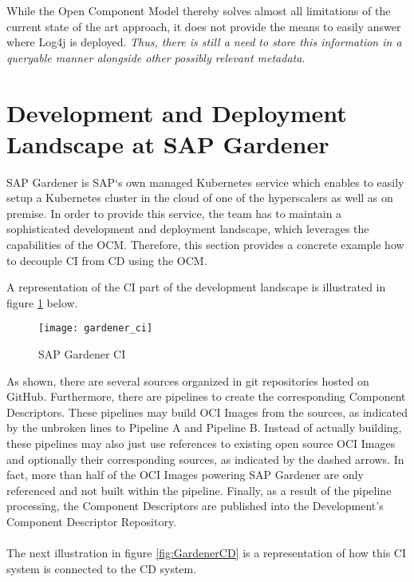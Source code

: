 While the Open Component Model thereby solves almost all limitations of the current state of the art approach, it does not provide the means to easily answer where Log4j %
is deployed. \emph{Thus, there is still a need to store this information in a queryable manner alongside other possibly relevant metadata.} %

\section{Development and Deployment Landscape at SAP Gardener} \label{sec:Development and Deployment Landscape at SAP Gardener}
SAP Gardener is SAP`s own managed Kubernetes service which enables to easily setup a Kubernetes cluster in the cloud of one of the hyperscalers as well as on premise. In order to provide this service, the team has to maintain a sophisticated development and deployment landscape, which leverages the capabilities of the OCM. Therefore, this section provides a concrete example how to decouple CI from CD using the OCM.\par
A representation of the CI part of the development landscape is illustrated in figure \ref{fig:GardenerCI} below.

\begin{figure}[H]
	\centering
	\texttt{[image: gardener\_ci]}
	\caption[SAP Gardener CI]{SAP Gardener CI }
	\label{fig:GardenerCI}
\end{figure}

As shown, there are several sources organized in git repositories hosted on GitHub. Furthermore, there are pipelines to create the corresponding Component Descriptors.
These pipelines may build OCI Images from the sources, as indicated by the unbroken lines to Pipeline A and Pipeline B. Instead of actually building, these pipelines may also just use references to existing open source OCI Images and optionally their corresponding sources, as indicated by the dashed arrows. In fact, more than half of the OCI Images powering SAP Gardener are only referenced and not built within the pipeline. Finally, as a result of the pipeline processing, the Component Descriptors are published into the Development's Component Descriptor Repository.\\\\
The next illustration in figure \ref{fig:GardenerCD} is a representation of how this CI system is connected to the CD system.

